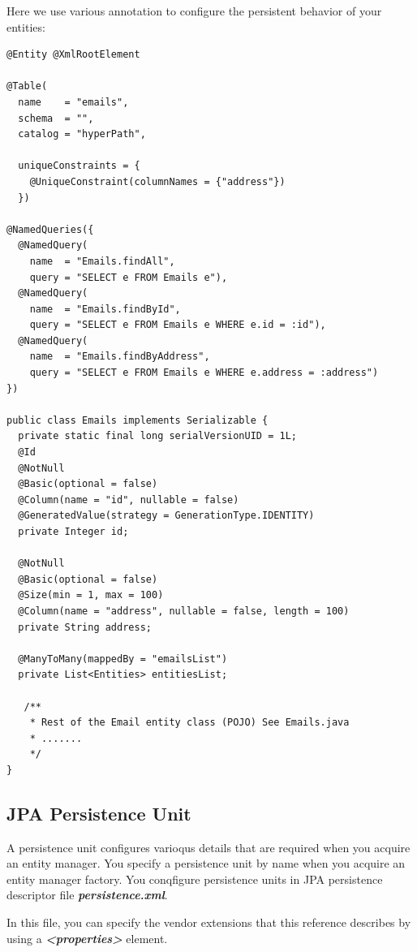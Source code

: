Here we use various annotation to configure the persistent behavior of your
entities: \begin{lstlisting}[label=Emails JPA entity,caption=Emails JPA entity]
@Entity @XmlRootElement

@Table(
  name    = "emails",
  schema  = "",
  catalog = "hyperPath",

  uniqueConstraints = {
    @UniqueConstraint(columnNames = {"address"})
  })

@NamedQueries({
  @NamedQuery(
    name  = "Emails.findAll",
    query = "SELECT e FROM Emails e"),
  @NamedQuery(
    name  = "Emails.findById",
    query = "SELECT e FROM Emails e WHERE e.id = :id"),
  @NamedQuery(
    name  = "Emails.findByAddress",
    query = "SELECT e FROM Emails e WHERE e.address = :address")
})

public class Emails implements Serializable {
  private static final long serialVersionUID = 1L;
  @Id
  @NotNull
  @Basic(optional = false)
  @Column(name = "id", nullable = false)
  @GeneratedValue(strategy = GenerationType.IDENTITY)
  private Integer id;

  @NotNull
  @Basic(optional = false)
  @Size(min = 1, max = 100)
  @Column(name = "address", nullable = false, length = 100)
  private String address;

  @ManyToMany(mappedBy = "emailsList")
  private List<Entities> entitiesList;

   /**
    * Rest of the Email entity class (POJO) See Emails.java
  	* .......
  	*/
}
\end{lstlisting}

\subsection{JPA Persistence Unit}
A persistence unit configures varioqus details that are required when you
acquire an entity manager. You specify a persistence unit by name when you
acquire an entity manager factory. You conqfigure persistence units in JPA
persistence descriptor file \textbf{\textit{\textsf{persistence.xml}}}.

In this file, you can specify the vendor extensions that this reference describes
by using a \textit{\textbf{\textsf{<properties>}}} element.


